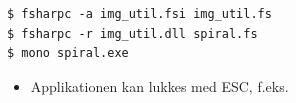 \documentclass[rgb]{beamer}
\begin{document}
\begin{frame}[fragile]
\begin{footnotesize}

  \vspace{1ex}

  \begin{minipage}[b]{0.60\textwidth}
\begin{verbatim}
$ fsharpc -a img_util.fsi img_util.fs
$ fsharpc -r img_util.dll spiral.fs
$ mono spiral.exe
\end{verbatim}

\begin{itemize}
\item Applikationen kan lukkes med ESC, f.eks.
\end{itemize}
\end{minipage}\hfill\begin{minipage}[b]{0.35\textwidth}

  \end{minipage}

\end{footnotesize}
\end{frame}
\end{document}
